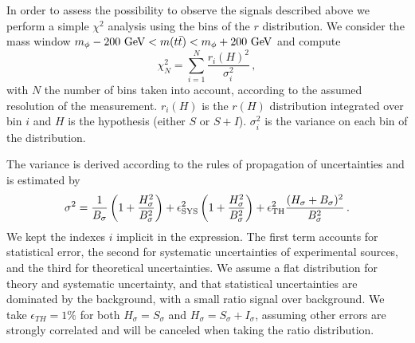 \documentclass[aps,prd,amsmath,amssymb,superscriptaddress, preprintnumbers,preprint,nofootinbib,a4paper]{revtex4}
\newcommand{\GeV}{\,\text{GeV}}
\begin{document}
In order to assess the possibility to observe the signals described above we perform a simple $\chi^2$ analysis
using the bins of the $r$ distribution.  We consider the mass window $m_\phi-200\,{\rm \GeV}< m(t\bar{t})< m_\phi+200\,{\rm \GeV}$ and compute
%
\begin{equation}
\chi^2_{N}=\sum_{i=1}^{N}\frac{r_i(H)^2}{\sigma_i^2}\,,
\end{equation}
%
with $N$ the number of bins taken into account, according to the assumed resolution of the measurement.
$r_i(H)$ is the $r(H)$ distribution integrated over bin $i$ and $H$ is the hypothesis (either $S$ or $S+I$). 
$\sigma^2_i$ is the variance on each bin of the distribution.

The variance is derived according to the rules of propagation of uncertainties and is estimated by
\begin{equation}
\sigma^2 = \frac{1}{B_\sigma}\left(1+\frac{H_\sigma^2}{B_\sigma^2}\right) 
+ \epsilon_{\rm SYS}^2\left(1+\frac{H_\sigma^2}{B_\sigma^2}\right) 
+ \epsilon_{\rm TH}^2\frac{(H_\sigma+B_\sigma)^2}{B_\sigma^2} \,.
\end{equation}
We kept the indexes $i$ implicit in the expression. The first term accounts for statistical error, the second for systematic uncertainties of experimental sources, and the third for theoretical uncertainties.
We assume a flat distribution for theory and systematic uncertainty, and that statistical uncertainties are dominated by the background, with a small ratio signal over background.
We take  $\epsilon_{TH}=1\%$ for both $H_\sigma=S_\sigma$ and $H_\sigma=S_\sigma+I_\sigma$, assuming other errors are strongly correlated and will be canceled when taking the ratio distribution. 
\end{document}
